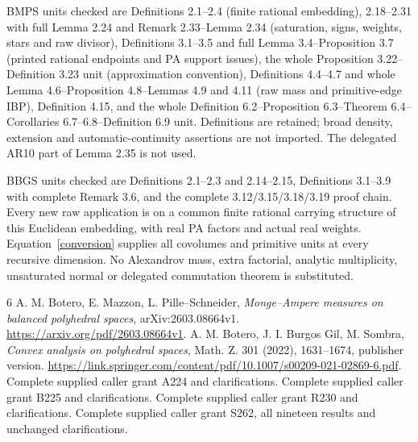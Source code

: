 \documentclass[11pt]{article}
\begin{document}
BMPS units checked are Definitions 2.1--2.4 (finite rational
embedding), 2.18--2.31 with full Lemma 2.24 and Remark 2.33--Lemma
2.34 (saturation, signs, weights, stars and raw divisor),
Definitions 3.1--3.5 and full Lemma 3.4--Proposition 3.7 (printed
rational endpoints and PA support issues), the whole Proposition
3.22--Definition 3.23 unit (approximation convention), Definitions
4.4--4.7 and whole Lemma 4.6--Proposition 4.8--Lemmas 4.9 and
4.11 (raw mass and primitive-edge IBP), Definition 4.15, and the
whole Definition 6.2--Proposition 6.3--Theorem 6.4--Corollaries
6.7--6.8--Definition 6.9 unit. Definitions are retained; broad
density, extension and automatic-continuity assertions are not
imported. The delegated AR10 part of Lemma 2.35 is not used.

BBGS units checked are Definitions 2.1--2.3 and 2.14--2.15,
Definitions 3.1--3.9 with complete Remark 3.6, and the complete
3.12/3.15/3.18/3.19 proof chain. Every new raw application is
on a common finite rational carrying structure of this
Euclidean embedding, with real PA factors and actual real
weights. Equation~\eqref{conversion} supplies all covolumes
and primitive units at every recursive dimension. No
Alexandrov mass, extra factorial, analytic multiplicity,
unsaturated normal or delegated commutation theorem is substituted.

\begin{thebibliography}{6}
 A. M. Botero, E. Mazzon, L. Pille--Schneider,
\emph{Monge--Ampere measures on balanced polyhedral spaces},
arXiv:2603.08664v1. \url{https://arxiv.org/pdf/2603.08664v1}.
 A. M. Botero, J. I. Burgos Gil, M. Sombra,
\emph{Convex analysis on polyhedral spaces}, Math. Z. 301 (2022),
1631--1674, publisher version.
\url{https://link.springer.com/content/pdf/10.1007/s00209-021-02869-6.pdf}.
 Complete supplied caller grant A224 and clarifications.
 Complete supplied caller grant B225 and clarifications.
 Complete supplied caller grant R230 and clarifications.
 Complete supplied caller grant S262, all nineteen results
and unchanged clarifications.
\end{thebibliography}
\end{document}
